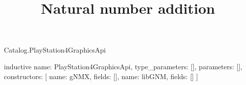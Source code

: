 \begin{lexlean}{Catalog.PlayStation4GraphicsApi}
\title{Natural number addition}
\begin{semanticmodule}
inductive{
  name: PlayStation4GraphicsApi,
  type_parameters: [],
  parameters: [],
  constructors: [
    {name: gNMX, fields: []},
    {name: libGNM, fields: []}
  ]
}
\end{semanticmodule}
\end{lexlean}
